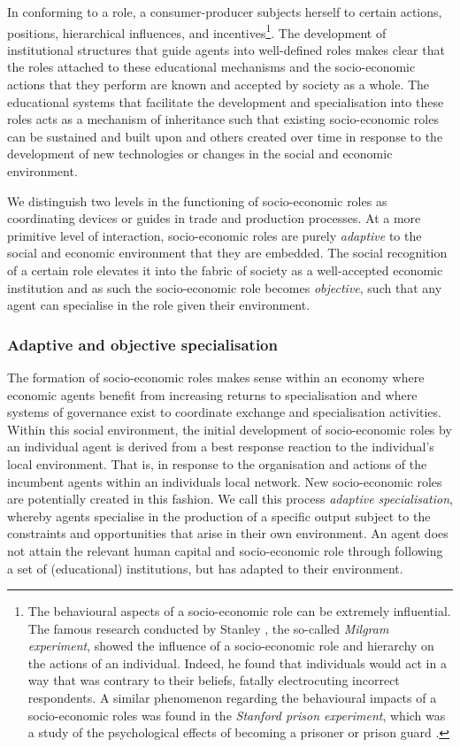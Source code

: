 In conforming to a role, a consumer-producer subjects herself to certain actions, positions, hierarchical influences, and incentives\footnote{The behavioural aspects of a socio-economic role can be extremely influential. The famous research conducted by Stanley \citet{Milgram1963}, the so-called \emph{Milgram experiment}, showed the influence of a socio-economic role and hierarchy on the actions of an individual. Indeed, he found that individuals would act in a way that was contrary to their beliefs, fatally electrocuting incorrect respondents. A similar phenomenon regarding the behavioural impacts of a socio-economic roles was found in the \emph{Stanford prison experiment}, which was a study of the psychological effects of becoming a prisoner or prison guard \citep{Zimbardo1971}.}. The development of institutional structures that guide agents into well-defined roles makes clear that the roles attached to these educational mechanisms and the socio-economic actions that they perform are known and accepted by society as a whole. The educational systems that facilitate the development and specialisation into these roles acts as a mechanism of inheritance such that existing socio-economic roles can be sustained and built upon and others created over time in response to the development of new technologies or changes in the social and economic environment.

We distinguish two levels in the functioning of socio-economic roles as coordinating devices or guides in trade and production processes. At a more primitive level of interaction, socio-economic roles are purely \emph{adaptive} to the social and economic environment that they are embedded. The social recognition of a certain role elevates it into the fabric of society as a well-accepted economic institution and as such the socio-economic role becomes \emph{objective}, such that any agent can specialise in the role given their environment.

\subsubsection{Adaptive and objective specialisation}

The formation of socio-economic roles makes sense within an economy where economic agents benefit from increasing returns to specialisation and where systems of governance exist to coordinate exchange and specialisation activities. Within this social environment, the initial development of socio-economic roles by an individual agent is derived from a best response reaction to the individual's local environment. That is, in response to the organisation and actions of the incumbent agents within an individuals local network. New socio-economic roles are potentially created in this fashion. We call this process \emph{adaptive specialisation}, whereby agents specialise in the production of a specific output subject to the constraints and opportunities that arise in their own environment. An agent does not attain the relevant human capital and socio-economic role through following a set of (educational) institutions, but has adapted to their environment.

